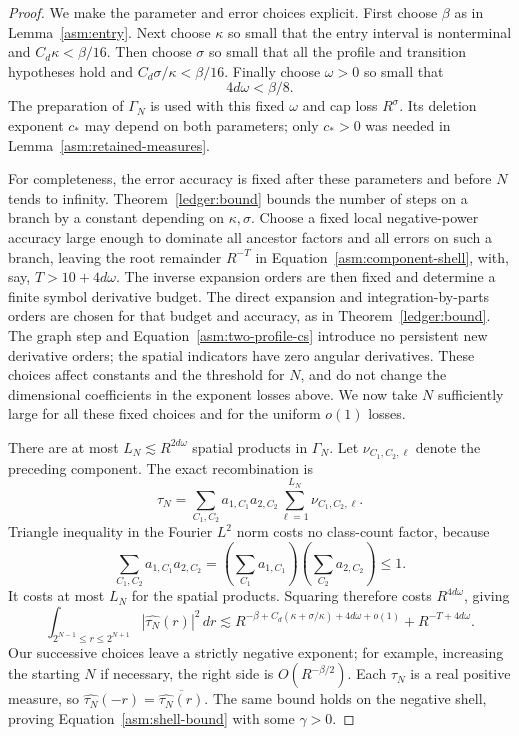 \begin{proof}
We make the parameter and error choices explicit.  First choose
$\beta$ as in Lemma~\ref{asm:entry}.  Next choose $\kappa$ so small
that the entry interval is nonterminal and
$C_d\kappa<\beta/16$.  Then choose $\sigma$ so small that all the
profile and transition hypotheses hold and
$C_d\sigma/\kappa<\beta/16$.  Finally choose $\omega>0$ so small
that
\begin{equation}
 \label{asm:omega-choice}
 4d\omega<\beta/8.
\end{equation}
The preparation of $\Gamma_N$ is used with this fixed $\omega$ and
cap loss $R^\sigma$.  Its deletion exponent $c_*$ may depend on both
parameters; only $c_*>0$ was needed in
Lemma~\ref{asm:retained-measures}.

For completeness, the error accuracy is fixed after these parameters
and before $N$ tends to infinity.  Theorem~\ref{ledger:bound} bounds
the number of steps on a branch by a constant depending on
$\kappa,\sigma$.  Choose a fixed local negative-power accuracy large
enough to dominate all ancestor factors and all errors on such a
branch, leaving the root remainder $R^{-T}$ in
Equation~\eqref{asm:component-shell}, with, say, $T>10+4d\omega$.
The inverse expansion orders are then fixed and determine a finite
symbol derivative budget.  The direct expansion and
integration-by-parts orders are chosen for that budget and accuracy,
as in Theorem~\ref{ledger:bound}.  The graph step and
Equation~\eqref{asm:two-profile-cs} introduce no persistent new
derivative orders; the spatial indicators have zero angular
derivatives.  These choices affect constants and the threshold for
$N$, and do not change the dimensional coefficients in the exponent
losses above.  We now take $N$ sufficiently large for all these fixed
choices and for the uniform $o(1)$ losses.

There are at most $L_N\lesssim R^{2d\omega}$ spatial products in
$\Gamma_N$.  Let $\nu_{C_1,C_2,\ell}$ denote the preceding component.
The exact recombination is
\[
 \tau_N=\sum_{C_1,C_2}a_{1,C_1}a_{2,C_2}
                    \sum_{\ell=1}^{L_N}\nu_{C_1,C_2,\ell}.
\]
Triangle inequality in the Fourier $L^2$ norm costs no class-count
factor, because
\[
 \sum_{C_1,C_2}a_{1,C_1}a_{2,C_2}
 =\left(\sum_{C_1}a_{1,C_1}\right)
  \left(\sum_{C_2}a_{2,C_2}\right)\le1.
\]
It costs at most $L_N$ for the spatial products.  Squaring therefore
costs $R^{4d\omega}$, giving
\begin{equation}
 \label{asm:assembled-shell}
 \int_{2^{N-1}\le r\le2^{N+1}}
                  |\widehat{\tau_N}(r)|^2\,dr
 \lesssim R^{-\beta+C_d(\kappa+\sigma/\kappa)+4d\omega+o(1)}
                       +R^{-T+4d\omega}.
\end{equation}
Our successive choices leave a strictly negative exponent; for
example, increasing the starting $N$ if necessary, the right side is
$O(R^{-\beta/2})$.  Each $\tau_N$ is a real positive measure, so
$\widehat{\tau_N}(-r)=\overline{\widehat{\tau_N}(r)}$.  The same
bound holds on the negative shell, proving
Equation~\eqref{asm:shell-bound} with some $\gamma>0$.
\end{proof}

